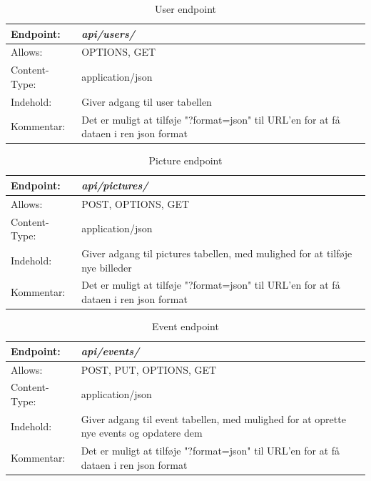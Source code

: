 \begin{table}[H]
\begin{tabular}{| p{3cm}| p{11.5cm}|}
\hline
Endpoint:	 							& \textbf{\textit{api/users/}} \\\hline
Allows:									& OPTIONS, GET\\\hline
Content-Type:						& application/json\\\hline 
Indehold:								& Giver adgang til user tabellen\\\hline 
Kommentar:							& Det er muligt at tilføje "?format=json" til URL'en for at få dataen i ren json format\\\hline
\end{tabular}
\caption{User endpoint}
\label{user_endpoint}
\end{table}

\begin{table}[H]
\begin{tabular}{| p{3cm}| p{11.5cm}|}
\hline
Endpoint:	 							&\textbf{\textit{api/pictures/}} \\\hline
Allows:									& POST, OPTIONS, GET\\\hline
Content-Type:						& application/json\\\hline 
Indehold:								& Giver adgang til pictures tabellen, med mulighed for at tilføje nye billeder\\\hline 
Kommentar:							& Det er muligt at tilføje "?format=json" til URL'en for at få dataen i ren json format\\\hline
\end{tabular}
\caption{Picture endpoint}
\label{picture_endpoint}
\end{table}

\begin{table}[H]
\begin{tabular}{| p{3cm}| p{11.5cm}|}
\hline
Endpoint:	 							&\textbf{\textit{api/events/}}\\\hline
Allows:									& POST, PUT, OPTIONS, GET\\\hline
Content-Type:						& application/json\\\hline 
Indehold:								& Giver adgang til event tabellen, med mulighed for at oprette nye events og opdatere dem\\\hline 
Kommentar:							& Det er muligt at tilføje "?format=json" til URL'en for at få dataen i ren json format\\\hline
\end{tabular}
\caption{Event endpoint}
\label{event_endpoint}
\end{table}

